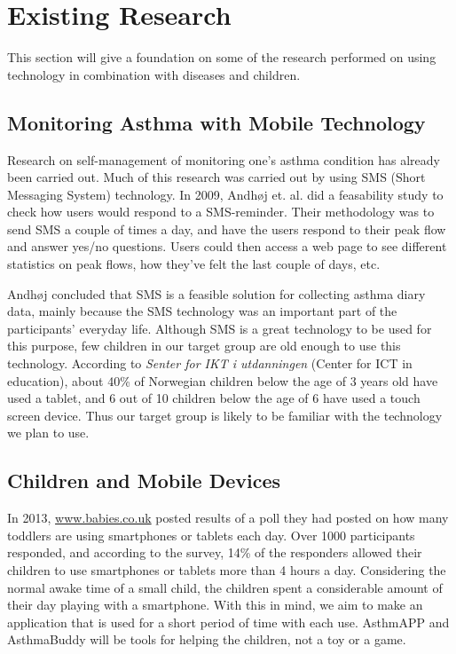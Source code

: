 \section{Existing Research}
\label{sec:existing-research}

This section will give a foundation on some of the research performed on using technology in combination with diseases and children. 


\subsection{Monitoring Asthma with Mobile Technology}
Research on self-management of monitoring one's asthma condition has already been carried out. Much of this research was carried out by using SMS (Short Messaging System) technology. In 2009, Andh\o j  et. al.\cite{anhoj2004feasibility} did a feasability study to check how users would respond to a SMS-reminder. Their methodology was to send SMS a couple of times a day, and have the users respond to their peak flow and answer yes/no questions. Users could then access a web page to see different statistics on peak flows, how they've felt the last couple of days, etc.

Andh\o j \etal{} concluded that SMS is a feasible solution for collecting asthma diary data, mainly because the SMS technology was an important part of the participants' everyday life. Although SMS is a great technology to be used for this purpose, few children in our target group are old enough to use this technology. According to \emph{Senter for IKT i utdanningen} (Center for ICT in education), about 40\% of Norwegian children below the age of 3 years old have used a tablet, and 6 out of 10 children below the age of 6 have used a touch screen device\cite{nrkchilduse}. Thus our target group is likely to be familiar with the technology we plan to use.  


\subsection{Children and Mobile Devices}
In 2013, \url{www.babies.co.uk} posted results of a poll they had posted on how many toddlers are using smartphones or tablets each day\cite{babiesusageoftablets}. Over 1000 participants responded,  and according to the survey, 14\% of the responders allowed their children to use smartphones or tablets more than 4 hours a day. Considering the normal awake time of a small child, the children spent a considerable amount of their day playing with a smartphone. With this in mind, we aim to make an application that is used for a short period of time with each use. AsthmAPP and AsthmaBuddy will be tools for helping the children, not a toy or a game.


